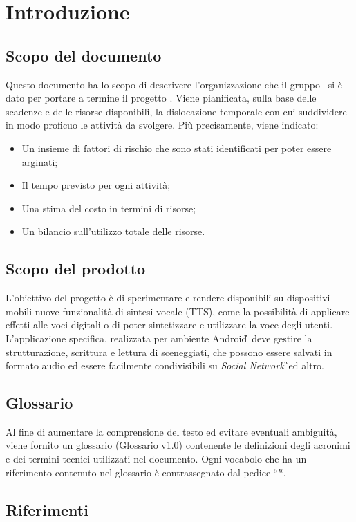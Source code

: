 \section{Introduzione}

\subsection{Scopo del documento}
Questo documento ha lo scopo di descrivere l'organizzazione che il gruppo \GRUPPO\ si è dato per portare a termine il progetto \PROGETTO. Viene pianificata, sulla base delle scadenze e delle risorse disponibili, la dislocazione temporale con cui suddividere in modo proficuo le attività da svolgere. Più precisamente, viene indicato:
\begin{itemize}
\item Un insieme di fattori di rischio che sono stati identificati per poter essere arginati;
\item Il tempo previsto per ogni attività;
\item Una stima del costo in termini di risorse;
\item Un bilancio sull'utilizzo totale delle risorse.
\end{itemize}  

\subsection{Scopo del prodotto}
L'obiettivo del progetto è di sperimentare e rendere disponibili su dispositivi mobili nuove funzionalità di sintesi vocale (TTS\G), come la possibilità di applicare effetti alle voci digitali o di poter sintetizzare e utilizzare la voce degli utenti. L'applicazione specifica, realizzata per ambiente Android\G\, deve gestire la strutturazione, scrittura e lettura di sceneggiati, che possono essere salvati in formato audio ed essere facilmente condivisibili su \textit{Social Network}\G\ ed altro.

\subsection{Glossario}
Al fine di aumentare la comprensione del testo ed evitare eventuali ambiguità, viene fornito un glossario (Glossario v1.0) contenente le definizioni degli acronimi e dei termini tecnici utilizzati nel documento. Ogni vocabolo che ha un riferimento contenuto nel glossario è contrassegnato dal pedice “\G “.

\subsection{Riferimenti}

